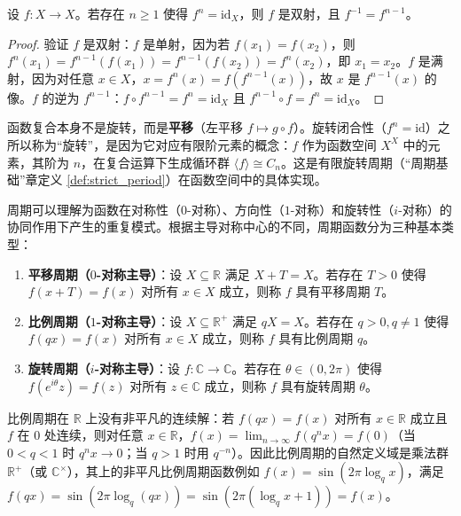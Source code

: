 \begin{proposition}[旋转闭合性蕴含双射]\label{prop:rotation_closure_bijective}
设 $f: X \to X$。若存在 $n \ge 1$ 使得 $f^n = \text{id}_X$，则 $f$ 是双射，且 $f^{-1} = f^{n-1}$。
\end{proposition}

\begin{proof}
验证 $f$ 是双射：$f$ 是单射，因为若 $f(x_1) = f(x_2)$，则 $f^n(x_1) = f^{n-1}(f(x_1)) = f^{n-1}(f(x_2)) = f^n(x_2)$，即 $x_1 = x_2$。$f$ 是满射，因为对任意 $x \in X$，$x = f^n(x) = f(f^{n-1}(x))$，故 $x$ 是 $f^{n-1}(x)$ 的像。$f$ 的逆为 $f^{n-1}$：$f \circ f^{n-1} = f^n = \text{id}_X$ 且 $f^{n-1} \circ f = f^n = \text{id}_X$。
\end{proof}

\begin{remark}[函数复合与旋转的关系]\label{rem:composition_rotation}
函数复合本身不是旋转，而是\textbf{平移}（左平移 $f \mapsto g \circ f$）。旋转闭合性（$f^n = \text{id}$）之所以称为“旋转”，是因为它对应有限阶元素的概念：$f$ 作为函数空间 $X^X$ 中的元素，其阶为 $n$，在复合运算下生成循环群 $\langle f \rangle \cong C_n$。这是有限旋转周期（“周期基础”章定义 \ref{def:strict_period}）在函数空间中的具体实现。
\end{remark}

\begin{definition}\label{def:periodicity}
周期可以理解为函数在对称性（$0$-对称）、方向性（$1$-对称）和旋转性（$i$-对称）的协同作用下产生的重复模式。根据主导对称中心的不同，周期函数分为三种基本类型：
\begin{enumerate}[label=(\roman*)]
    \item \textbf{平移周期（$0$-对称主导）}：设 $X \subseteq \mathbb{R}$ 满足 $X + T = X$。若存在 $T > 0$ 使得 $f(x+T) = f(x)$ 对所有 $x \in X$ 成立，则称 $f$ 具有平移周期 $T$。
    \item \textbf{比例周期（$1$-对称主导）}：设 $X \subseteq \mathbb{R}^+$ 满足 $qX = X$。若存在 $q > 0, q \neq 1$ 使得 $f(qx) = f(x)$ 对所有 $x \in X$ 成立，则称 $f$ 具有比例周期 $q$。
    \item \textbf{旋转周期（$i$-对称主导）}：设 $f: \mathbb{C} \to \mathbb{C}$。若存在 $\theta \in (0, 2\pi)$ 使得 $f(e^{i\theta}z) = f(z)$ 对所有 $z \in \mathbb{C}$ 成立，则称 $f$ 具有旋转周期 $\theta$。
\end{enumerate}
\end{definition}

\begin{remark}[比例周期的非平凡性]\label{rem:scaling_period_nontrivial}
比例周期在 $\mathbb{R}$ 上没有非平凡的连续解：若 $f(qx) = f(x)$ 对所有 $x \in \mathbb{R}$ 成立且 $f$ 在 $0$ 处连续，则对任意 $x \in \mathbb{R}$，$f(x) = \lim_{n\to\infty} f(q^n x) = f(0)$（当 $0 < q < 1$ 时 $q^n x \to 0$；当 $q > 1$ 时用 $q^{-n}$）。因此比例周期的自然定义域是乘法群 $\mathbb{R}^+$（或 $\mathbb{C}^\times$），其上的非平凡比例周期函数例如 $f(x) = \sin(2\pi \log_q x)$，满足 $f(qx) = \sin(2\pi \log_q(qx)) = \sin(2\pi(\log_q x + 1)) = f(x)$。
\end{remark}


